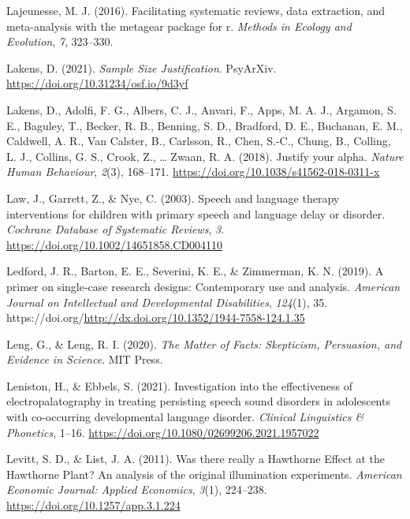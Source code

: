 \documentclass{krantz}
\newlength{\cslhangindent}
\newlength{\cslentryspacingunit} %
\newenvironment{CSLReferences}[2] %
{%
\setlength{\parindent}{0pt}
\ifodd #1
\let\oldpar\par
\def\par{\hangindent=\cslhangindent\oldpar}
\fi
\setlength{\parskip}{#2\cslentryspacingunit}
}%
{}
\begin{document}
\begin{CSLReferences}{1}{0}
\leavevmode{}%
Lajeunesse, M. J. (2016). Facilitating systematic reviews, data extraction, and meta-analysis with the metagear package for r. \emph{Methods in Ecology and Evolution}, \emph{7}, 323--330.

\leavevmode{}%
Lakens, D. (2021). \emph{Sample {Size Justification}}. {PsyArXiv}. \url{https://doi.org/10.31234/osf.io/9d3yf}

\leavevmode{}%
Lakens, D., Adolfi, F. G., Albers, C. J., Anvari, F., Apps, M. A. J., Argamon, S. E., Baguley, T., Becker, R. B., Benning, S. D., Bradford, D. E., Buchanan, E. M., Caldwell, A. R., Van Calster, B., Carlsson, R., Chen, S.-C., Chung, B., Colling, L. J., Collins, G. S., Crook, Z., \ldots{} Zwaan, R. A. (2018). Justify your alpha. \emph{Nature Human Behaviour}, \emph{2}(3), 168--171. \url{https://doi.org/10.1038/s41562-018-0311-x}

\leavevmode{}%
Law, J., Garrett, Z., \& Nye, C. (2003). Speech and language therapy interventions for children with primary speech and language delay or disorder. \emph{Cochrane Database of Systematic Reviews}, \emph{3}. \url{https://doi.org/10.1002/14651858.CD004110}

\leavevmode{}%
Ledford, J. R., Barton, E. E., Severini, K. E., \& Zimmerman, K. N. (2019). A primer on single-case research designs: {Contemporary} use and analysis. \emph{American Journal on Intellectual and Developmental Disabilities}, \emph{124}(1), 35. https://doi.org/\url{http://dx.doi.org/10.1352/1944-7558-124.1.35}

\leavevmode{}%
Leng, G., \& Leng, R. I. (2020). \emph{The {Matter} of {Facts}: {Skepticism}, {Persuasion}, and {Evidence} in {Science}}. {MIT Press}.

\leavevmode{}%
Leniston, H., \& Ebbels, S. (2021). Investigation into the effectiveness of electropalatography in treating persisting speech sound disorders in adolescents with co-occurring developmental language disorder. \emph{Clinical Linguistics \& Phonetics}, 1--16. \url{https://doi.org/10.1080/02699206.2021.1957022}

\leavevmode{}%
Levitt, S. D., \& List, J. A. (2011). Was there really a {Hawthorne Effect} at the {Hawthorne Plant}? {An} analysis of the original illumination experiments. \emph{American Economic Journal: Applied Economics}, \emph{3}(1), 224--238. \url{https://doi.org/10.1257/app.3.1.224}


\end{CSLReferences}
\end{document}

